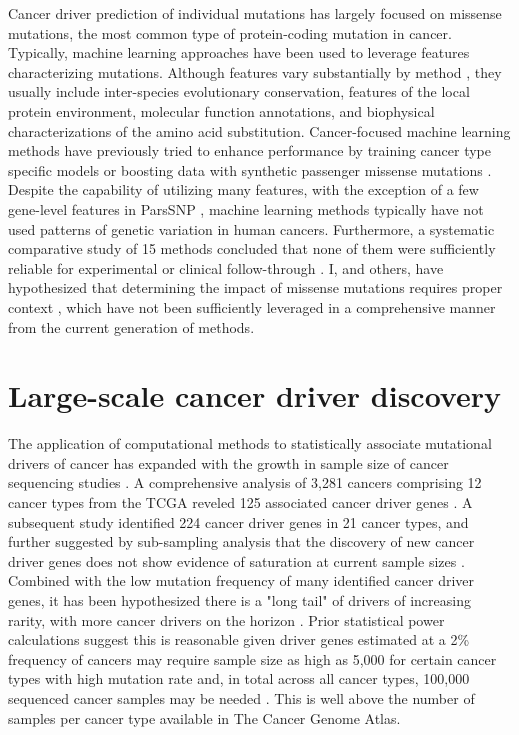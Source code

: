 Cancer driver prediction of individual mutations has largely focused on missense mutations, the most common type of protein-coding mutation in cancer. Typically, machine learning approaches have been used to leverage features characterizing mutations. Although features vary substantially by method \cite{RN32, RN33, RN35, RN36, RN39, RN29, RN37}, they usually include inter-species evolutionary conservation, features of the local protein environment, molecular function annotations, and biophysical characterizations of the amino acid substitution. Cancer-focused machine learning methods have previously tried to enhance performance by training cancer type specific models \cite{RN10, RN12} or boosting data with synthetic passenger missense mutations \cite{RN10}. Despite the capability of utilizing many features, with the exception of a few gene-level features in ParsSNP \cite{RN9}, machine learning methods typically have not used patterns of genetic variation in human cancers. Furthermore, a systematic comparative study of 15 methods concluded that none of them were sufficiently reliable for experimental or clinical follow-through \cite{RN46}. I, and others, have hypothesized that determining the impact of missense mutations requires proper context \cite{RN47, RN57}, which have not been sufficiently leveraged in a comprehensive manner from the current generation of methods.

\section{Large-scale cancer driver discovery}
\label{sec:section}

The application of computational methods to statistically associate mutational drivers of cancer has expanded with the growth in sample size of cancer sequencing studies \cite{RN99, RN105, RN14, RN87, RN158, RN12, RN13, RN54, RN96, RN98, RN154, RN43}. A comprehensive analysis of 3,281 cancers comprising 12 cancer types from the TCGA reveled 125 associated cancer driver genes \cite{RN12}.  A subsequent study identified 224 cancer driver genes in 21 cancer types, and further suggested by sub-sampling analysis that the discovery of new cancer driver genes does not show evidence of saturation at current sample sizes \cite{RN14}. Combined with the low mutation frequency of many identified cancer driver genes, it has been hypothesized there is a "long tail" of drivers of increasing rarity, with more cancer drivers on the horizon \cite{RN148, RN147}. Prior statistical power calculations suggest this is reasonable given driver genes estimated at a 2\% frequency of cancers may require sample size as high as 5,000 for certain cancer types with high mutation rate and, in total across all cancer types, 100,000 sequenced cancer samples may be needed \cite{RN14}. This is well above the number of samples per cancer type available in The Cancer Genome Atlas. 


